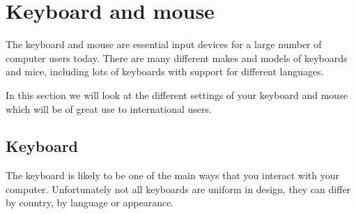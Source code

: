 
\section{Keyboard and mouse}

The keyboard and mouse are essential input devices for a large number of
computer users today. There are many different makes and models of keyboards and mice,
including lots of keyboards with support for different languages.

In this section we will look at the different settings of your keyboard and mouse which
will be of great use to international users.

\subsection{Keyboard}

The keyboard is likely to be one of the main ways that you interact with your
computer. Unfortunately not all keyboards are uniform in design, they can
differ by country, by language or appearance.

